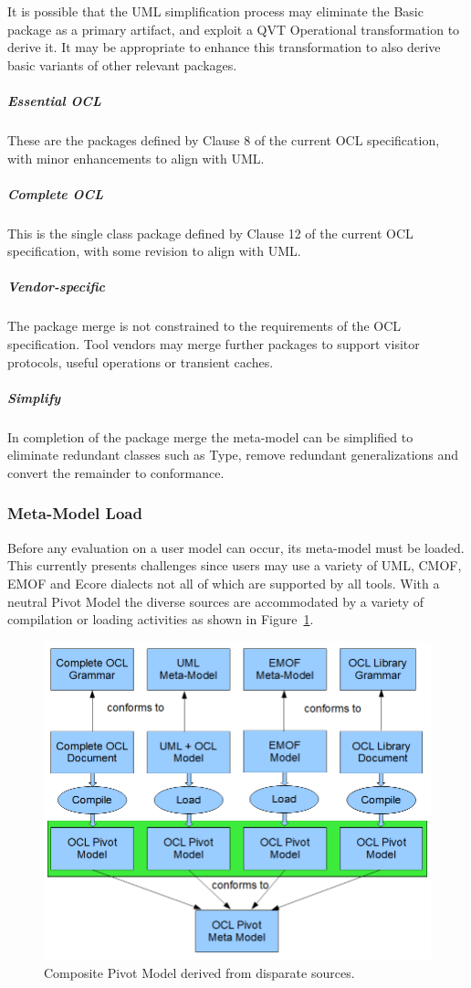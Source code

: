 \documentclass{eceasst}
\begin{document}
It is possible that the UML simplification process\cite{UML-simple} may eliminate the Basic package as a primary artifact, and exploit a QVT Operational transformation to derive it. It may be appropriate to enhance this transformation to also derive basic variants of other relevant packages.

\subparagraph{Essential OCL}

These are the packages defined by Clause 8 of the current OCL specification, with minor enhancements to align with UML. 

\subparagraph{Complete OCL}

This is the single class package defined by Clause 12 of the current OCL specification, with some revision to align with UML. 

\subparagraph{Vendor-specific}

The package merge is not constrained to the requirements of the OCL specification. Tool vendors may merge further packages to support visitor protocols, useful operations or transient caches.

\subparagraph{Simplify}

In completion of the package merge the meta-model can be simplified to eliminate redundant classes such as Type, remove redundant generalizations and convert the remainder to conformance.

\subsubsection{Meta-Model Load}

Before any evaluation on a user model can occur, its meta-model must be loaded. This currently presents challenges since users may use a variety of UML, CMOF, EMOF and Ecore dialects not all of which are supported by all tools. With a neutral Pivot Model the diverse sources are accommodated by a variety of compilation or loading activities as shown in Figure~\ref{fig:Load}.

\begin{figure}
  \begin{center}
    \includegraphics[width=4.75in]{Load.png}
  \end{center}
  \caption{Composite Pivot Model derived from disparate sources.}
  \label{fig:Load}
\end{figure}
\end{document}
